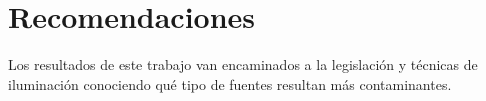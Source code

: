 \chapter{Recomendaciones}

Los resultados de este trabajo van encaminados a la legislación y técnicas de iluminación conociendo qué tipo de fuentes resultan más contaminantes. 